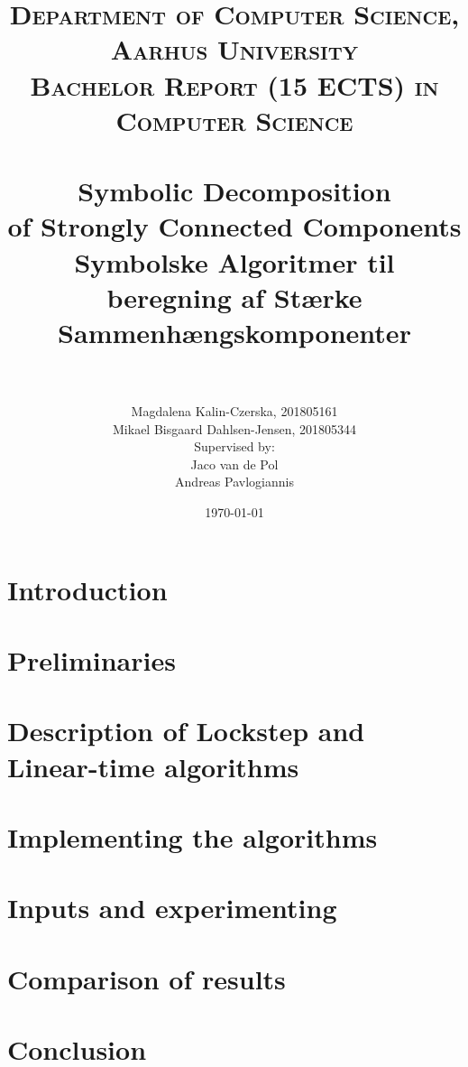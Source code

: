 \documentclass[a4, english]{article}
\title{\titlecontent}
\author{\large{Magdalena Kalin-Czerska, 201805161 \\ Mikael Bisgaard Dahlsen-Jensen, 201805344} \\ {\small Supervised by:} \\Jaco van de Pol \\ Andreas Pavlogiannis}
\title{	
  \normalfont \normalsize 
  \textsc{Department of Computer Science, Aarhus University \\ Bachelor Report (15 ECTS) in Computer Science} \\ [20pt] 
  \horrule{0.5pt} \\[0.4cm] %
  \huge Symbolic Decomposition \\ of Strongly Connected Components \\[0.5cm] %
  \large Symbolske Algoritmer til beregning af Stærke Sammenhængskomponenter \\ %
  \horrule{2pt} \\[0.5cm] %
}
\date{\today}
\newcommand{\sectionpath}{../sections/}
\begin{document}
\maketitle

\newpage

\newpage
\tableofcontents
\newpage
\section{Introduction}

\section{Preliminaries}

\section{Description of  Lockstep and Linear-time algorithms}

\section{Implementing the algorithms}


\section{Inputs and experimenting}


\section{Comparison of results}


\section{Conclusion}

\printbibliography
\newpage
\appendix

\end{document}
